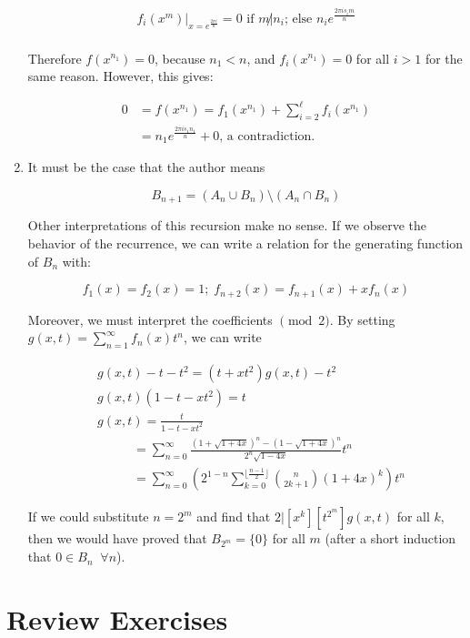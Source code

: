 \documentclass{book}
\numberwithin{equation}{section}
\begin{document}
\begin{enumerate}[label={8.\arabic*}]
\begin{align*}
f_i(x^{m})|_{x = e^{\frac{2\pi i}{n}}} = 0 \text{ if } m \not| n_i \text{; else }n_ie^{\frac{2\pi i s_i m}{n}} \\
\end{align*}

Therefore $f(x^{n_1}) = 0$, because $n_1 < n$, and $f_i(x^{n_1}) = 0$ for all $i > 1$ for the same reason.
However, this gives:

\begin{align*}
0 & = f(x^{n_1}) = f_1(x^{n_1}) + \sum_{i=2}^\ell f_i(x^{n_1}) \\
& = n_1e^{\frac{2\pi i s_1 n_1}{n}} + 0 \text{, a contradiction.}
\end{align*}

\item
It must be the case that the author means

$$B_{n+1} = (A_n \cup B_n) \setminus (A_n \cap B_n)$$

Other interpretations of this recursion make no sense. If we observe the behavior of the recurrence,
we can write a relation for the generating function of $B_n$ with:

$$f_1 (x) = f_2(x) = 1; \; f_{n+2}(x) = f_{n+1}(x) + xf_n(x)$$

Moreover, we must interpret the coefficients $\pmod{2}$. By setting \\
$g(x, t) = \sum_{n=1}^{\infty}f_n(x)t^n$, we can write

\begin{align*}
& g(x, t) - t - t^2 = (t + xt^2)g(x, t) - t^2 \\
& g(x, t)(1-t-xt^2) = t \\
& g(x, t) = \frac{t}{1-t-xt^2} \\
& \;\;\;\;\;\;\;\;\;\; = \sum_{n=0}^{\infty} \frac{(1+\sqrt{1+4x})^n - (1-\sqrt{1+4x})^n}{2^n \sqrt{1-4x}}t^n \\
& \;\;\;\;\;\;\;\;\;\; = \sum_{n=0}^{\infty} \left(2^{1-n} \sum_{k=0}^{\lfloor \frac{n-1}{2}\rfloor} {n \choose 2k+1}(1+4x)^k \right)t^n
\end{align*}

If we could substitute $n = 2^m$ and find that $2 | [x^k][t^{2^m}]g(x, t)$ for all $k$, then we would have proved that
$B_{2^m} = \{0\}$ for all $m$ (after a short induction that $0 \in B_n \;\; \forall n$).

\end{enumerate}

\chapter{Review Exercises}
\end{document}
